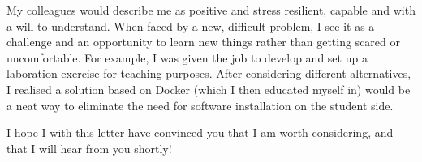 \documentclass[11pt, a4paper]{../awesome-cv} %
\begin{document}
\begin{cvletter}
My colleagues would describe me as positive and stress resilient, capable and with a will to understand.
When faced by a new, difficult problem, I see it as a challenge and an opportunity to learn new things rather than getting scared or uncomfortable. 
For example, I was given the job to develop and set up a laboration exercise for teaching purposes. 
After considering different alternatives, I realised a solution based on Docker (which I then educated myself in) would be a neat way to eliminate the need for software installation on the student side.

I hope I with this letter have convinced you that I am worth considering, and that I will hear from you shortly!

\end{cvletter}


\makeletterclosing %
\end{document}

